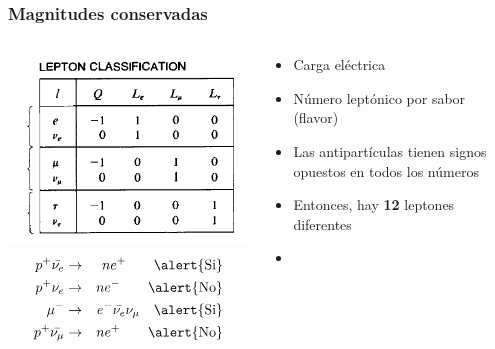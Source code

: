 \documentclass[xetex,mathserif,serif,10pt]{beamer}
\begin{document}
\begin{frame}
	\frametitle{Magnitudes conservadas}
  \begin{columns}
    {\centering \includegraphics[width=1.00\columnwidth]{./figs/u01/lepton-number.png}}
    \begin{eqnarray*}
      p^+ \bar{\nu_e} &\rightarrow& n e^+ \qquad \alert{\mathrm{Si}}\\
      p^+ \nu_e &\rightarrow& n e^- \qquad \alert{\mathrm{No}}\\ 
      \mu^- &\rightarrow& e^- \bar{\nu_e} \nu_\mu \ \ \  \alert{\mathrm{Si}}\\ 
      p^+ \bar{\nu_\mu} &\rightarrow& n e^+ \qquad \alert{\mathrm{No}}\\
    \end{eqnarray*}
    \begin{block}{}
      \begin{itemize}
        \item Carga eléctrica
        \item Número leptónico por sabor (flavor)
        \item Las antipartículas tienen signos opuestos en todos los números
        \item Entonces, hay {\bf 12} leptones diferentes
        \item {\color{chart12}{\bf Los números antes y después de la reacción deben conservarse}}
      \end{itemize}
    \end{block}
  \end{columns}
\end{frame}
\end{document}

